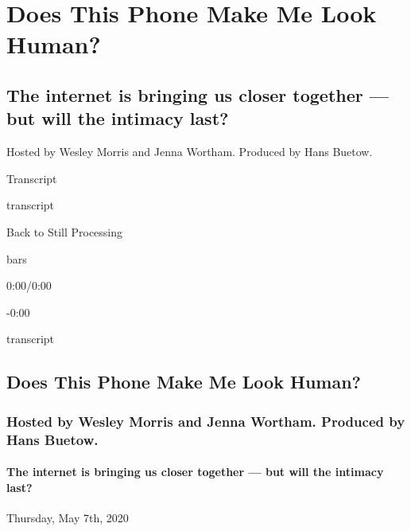 \hypertarget{does-this-phone-make-me-look-human-1}{%
\section{Does This Phone Make Me Look
Human?}\label{does-this-phone-make-me-look-human-1}}

\hypertarget{the-internet-is-bringing-us-closer-together--but-will-the-intimacy-last-1}{%
\subsection{The internet is bringing us closer together --- but will the
intimacy
last?}\label{the-internet-is-bringing-us-closer-together--but-will-the-intimacy-last-1}}

Hosted by Wesley Morris and Jenna Wortham. Produced by Hans Buetow.

Transcript

transcript

Back to Still Processing

bars

0:00/0:00

-0:00

transcript

\hypertarget{does-this-phone-make-me-look-human-2}{%
\subsection{Does This Phone Make Me Look
Human?}\label{does-this-phone-make-me-look-human-2}}

\hypertarget{hosted-by-wesley-morris-and-jenna-wortham-produced-by-hans-buetow-1}{%
\subsubsection{Hosted by Wesley Morris and Jenna Wortham. Produced by
Hans
Buetow.}\label{hosted-by-wesley-morris-and-jenna-wortham-produced-by-hans-buetow-1}}

\hypertarget{the-internet-is-bringing-us-closer-together--but-will-the-intimacy-last-2}{%
\paragraph{The internet is bringing us closer together --- but will the
intimacy
last?}\label{the-internet-is-bringing-us-closer-together--but-will-the-intimacy-last-2}}

Thursday, May 7th, 2020

